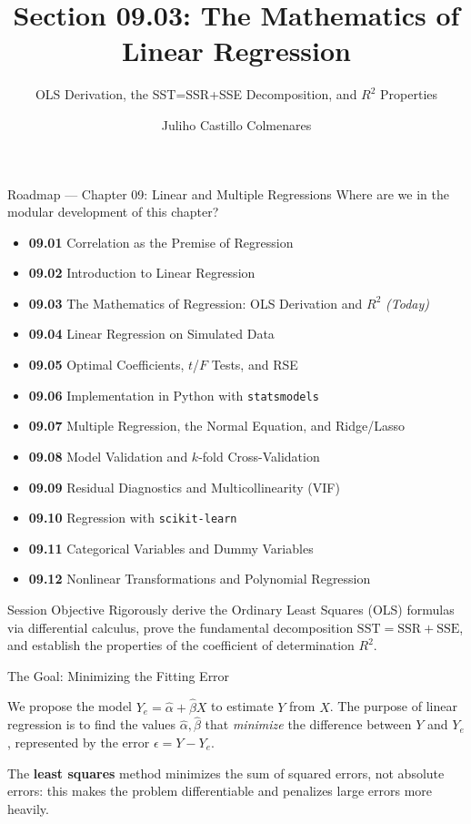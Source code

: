 \documentclass[10pt, aspectratio=169]{beamer}
\title[Mathematics of Regression]{Section 09.03: The Mathematics of Linear Regression}
\subtitle{OLS Derivation, the SST=SSR+SSE Decomposition, and $R^2$ Properties}
\author[J. Castillo Colmenares]{Juliho Castillo Colmenares}
\institute{Tecnológico de Monterrey}
\date{\vspace{-1.5cm}}
\begin{document}
\begin{frame}[plain]
  \titlepage
\end{frame}

\begin{frame}{Roadmap --- Chapter 09: Linear and Multiple Regressions}
  \scriptsize
  Where are we in the modular development of this chapter?
  \begin{itemize}\itemsep=0.02em
    \item \textbf{09.01} Correlation as the Premise of Regression
    \item \textbf{09.02} Introduction to Linear Regression
    \item \textbf{09.03} The Mathematics of Regression: OLS Derivation and $R^2$ \emph{(Today)}
    \item \textbf{09.04} Linear Regression on Simulated Data
    \item \textbf{09.05} Optimal Coefficients, $t$/$F$ Tests, and RSE
    \item \textbf{09.06} Implementation in Python with \texttt{statsmodels}
    \item \textbf{09.07} Multiple Regression, the Normal Equation, and Ridge/Lasso
    \item \textbf{09.08} Model Validation and $k$-fold Cross-Validation
    \item \textbf{09.09} Residual Diagnostics and Multicollinearity (VIF)
    \item \textbf{09.10} Regression with \texttt{scikit-learn}
    \item \textbf{09.11} Categorical Variables and Dummy Variables
    \item \textbf{09.12} Nonlinear Transformations and Polynomial Regression
  \end{itemize}
  \pause
  \vspace{-0.05cm}
  \begin{block}{Session Objective}
    Rigorously derive the Ordinary Least Squares (OLS) formulas via differential calculus, prove the fundamental decomposition $\text{SST}=\text{SSR}+\text{SSE}$, and establish the properties of the coefficient of determination $R^2$.
  \end{block}
\end{frame}

\begin{frame}{The Goal: Minimizing the Fitting Error}
  \footnotesize
  \begin{motivacion}
    We propose the model $Y_e=\hat\alpha+\hat\beta X$ to estimate $Y$ from $X$. The purpose of linear regression is to find the values $\hat\alpha,\hat\beta$ that \emph{minimize} the difference between $Y$ and $Y_e$, represented by the error $\epsilon=Y-Y_e$.
  \end{motivacion}

  \vspace{0.15cm}
  \pause
  The \textbf{least squares} method minimizes the sum of squared errors, not absolute errors: this makes the problem differentiable and penalizes large errors more heavily.
\end{frame}
\end{document}
